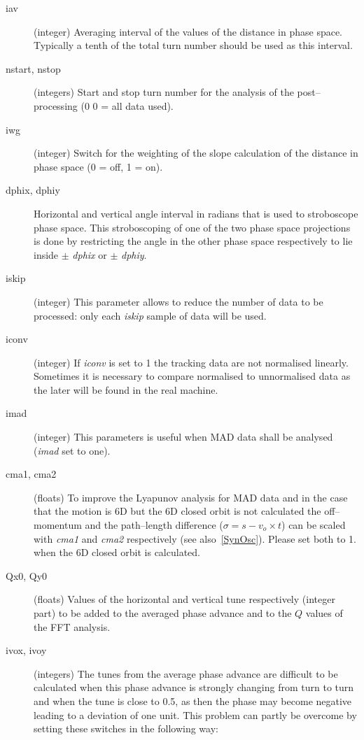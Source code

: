 \documentclass[a4paper,11pt]{report}
\begin{document}
\begin{description}
\item [iav] (integer) Averaging interval of the values of the distance
  in phase space. Typically a tenth of the total turn number should be
  used as this interval.
\item [nstart, nstop] (integers) Start and stop turn number for the
  analysis of the post--processing (0 0 = all data used).
\item [iwg] (integer) Switch for the weighting of the slope
  calculation of the distance in phase space (0 = off, 1 = on).
\item [dphix, dphiy] Horizontal and vertical angle interval in radians
  that is used to stroboscope phase space. This stroboscoping of one
  of the two phase space projections is done by restricting the angle
  in the other phase space respectively to lie inside $\pm$ {\em
    dphix} \/or $\pm$ {\em dphiy}.
\item [iskip] (integer) This parameter allows to reduce the number of
  data to be processed: only each {\em iskip} \/sample of data will be
  used.
\item [iconv] (integer) If {\em iconv} \/is set to 1 the tracking data
  are not normalised linearly. Sometimes it is necessary to compare
  normalised to unnormalised data as the later will be found in the
  real machine.
\item [imad] (integer) This parameters is useful when MAD data shall
  be analysed ({\em imad} \/set to one).
\item [cma1, cma2] (floats) To improve the Lyapunov analysis for MAD
  data and in the case that the motion is 6D but the 6D closed orbit
  is not calculated the off--momentum and the path--length difference
  ($\sigma = s - v_o \times t$) can be scaled with {\em cma1} \/and
  {\em cma2} \/respectively (see also~\ref{SynOsc}). Please set both
  to 1.  when the 6D closed orbit is calculated.
\item [Qx0, Qy0] (floats) Values of the horizontal and vertical tune
  respectively (integer part) to be added to the averaged phase
  advance and to the $Q$ values of the FFT analysis.
\item [ivox, ivoy] (integers) The tunes from the average phase advance
  are difficult to be calculated when this phase advance is strongly
  changing from turn to turn and when the tune is close to 0.5, as
  then the phase may become negative leading to a deviation of one
  unit. This problem can partly be overcome by setting these switches
  in the following way:

\end{description}
\end{document}
